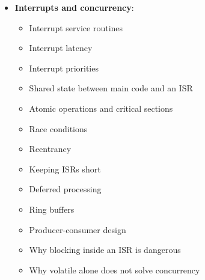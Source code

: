 \documentclass{report}
\begin{document}
\begin{itemize}
\begin{enumerate}
                \item RTC and low-power modes
            \end{enumerate}
            For every peripheral, understand:
            \begin{itemize}
                \item Which clock enables it
                \item Which GPIO alternate function it uses
                \item Which registers configure it
                \item How status flags work
                \item How polling differs from interrupts
                \item How DMA can move data without continuous CPU involvement
                \item What errors and edge cases can occur
            \end{itemize}
            Board exercises include LED blinking with a timer, button interrupts, UART command input, potentiometer sampling through the ADC, PWM brightness control, and reading a sensor through $\text{I}^{2}\text{C}$ or SPI.
        \item \textbf{Interrupts and concurrency}: 
            \begin{itemize}
                \item Interrupt service routines
                \item Interrupt latency
                \item Interrupt priorities
                \item Shared state between main code and an ISR
                \item Atomic operations and critical sections
                \item Race conditions
                \item Reentrancy
                \item Keeping ISRs short
                \item Deferred processing
                \item Ring buffers
                \item Producer-consumer design
                \item Why blocking inside an ISR is dangerous
                \item Why volatile alone does not solve concurrency
            \end{itemize}

\end{itemize}
\end{document}
